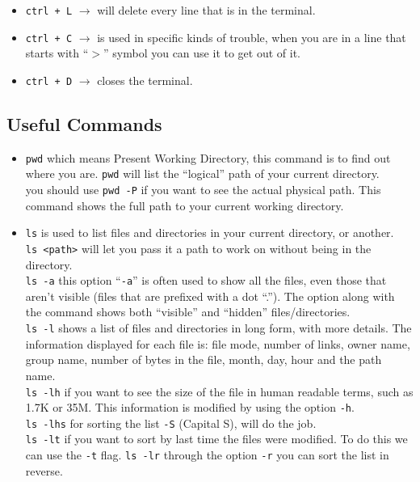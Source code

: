 \documentclass{article}
\begin{document}
    \begin{itemize}
    	\item {\tt ctrl + L} $\rightarrow$ will delete every line that is in the terminal.
    	\item {\tt ctrl + C} $\rightarrow$ is used in specific kinds of trouble, when you are in a line that starts with ``$>$'' symbol you can use it to get out of it.
    	\item {\tt ctrl + D} $\rightarrow$ closes the terminal.
    \end{itemize}
       
    \subsection{Useful Commands}
    
    \begin{itemize}
    	\item {\tt pwd} which means Present Working Directory, this command is to find out where you are. {\tt pwd} will list the ``logical'' path of your current directory.\\
    	you should use {\tt pwd -P} if you want to see the actual physical path. This command shows the full path to your current working directory.
    	
    	\item {\tt ls} is used to list files and directories in your current directory, or another.\\
    	{\tt ls <path>} will let you pass it a path to work on without being in the directory.\\
    	{\tt ls -a} this option ``{\tt -a}'' is often used to show all the files, even those that aren't visible (files that are prefixed with a dot ``.''). The option along with the command shows both ``visible'' and ``hidden'' files/directories.\\
    	{\tt ls -l} shows a list of files and directories in long form, with more details. The information displayed for each file is: file mode, number of links, owner name, group name, number of bytes in the file, month, day, hour and the path name.\\
    	{\tt ls -lh} if you want to see the size of the file in human readable terms, such as 1.7K or 35M. This information is modified by using the option {\tt -h}.\\
    	{\tt ls -lhs} for sorting the list {\tt -S} (Capital S), will do the job.\\
    	{\tt ls -lt} if you want to sort by last time the files were modified. To do this we can use the {\tt -t} flag.
    	{\tt ls -lr} through the option {\tt -r} you can sort the list in reverse.
    	

\end{itemize}
\end{document}
